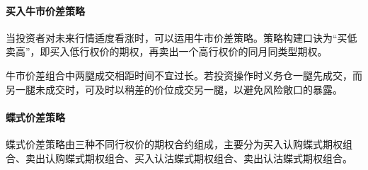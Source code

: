 \documentclass{article}
\begin{document}
\paragraph{买入牛市价差策略}
当投资者对未来行情适度看涨时，可以运用牛市价差策略。策略构建口诀为“买低卖高”，即买入低行权价的期权，再卖出一个高行权价的同月同类型期权。

牛市价差组合中两腿成交相距时间不宜过长。若投资操作时义务仓一腿先成交，而另一腿未成交时，可及时以稍差的价位成交另一腿，以避免风险敞口的暴露。

\paragraph{蝶式价差策略}
蝶式价差策略由三种不同行权价的期权合约组成，主要分为买入认购蝶式期权组合、卖出认购蝶式期权组合、买入认沽蝶式期权组合、卖出认沽蝶式期权组合。
\end{document}
